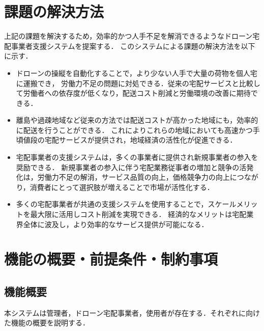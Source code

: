 \documentclass[a4paper, titlepage]{jsarticle}
\begin{document}
\section{課題の解決方法}
上記の課題を解決するため，効率的かつ人手不足を解消できるようなドローン宅配事業者支援システムを提案する．
このシステムによる課題の解決方法を以下に示す．
\begin{itemize}
    \item ドローンの操縦を自動化することで，より少ない人手で大量の荷物を個人宅に運搬でき，
    労働力不足の問題に対処できる．従来の宅配サービスと比較して労働者への依存度が低くなり，配送コスト削減と労働環境の改善に期待できる．

    \item 離島や過疎地域など従来の方法では配送コストが高かった地域にも，効率的に配送を行うことができる．
    これによりこれらの地域においても高速かつ手頃値段の宅配サービスが提供され，地域経済の活性化が促進できる．

    \item 宅配事業者の支援システムは，多くの事業者に提供され新規事業者の参入を奨励できる．
    新規事業者の参入に伴う宅配業務従事者の増加と競争の活発化は，労働力不足の解消，サービス品質の向上，価格競争力の向上につながり，消費者にとって選択肢が増えることで市場が活性化する．

    \item 多くの宅配事業者が共通の支援システムを使用することで，スケールメリットを最大限に活用しコスト削減を実現できる．
    経済的なメリットは宅配業界全体に波及し，より効率的なサービス提供が可能になる．


\end{itemize}

\section{機能の概要・前提条件・制約事項}
\subsection{機能概要}
本システムは管理者，ドローン宅配事業者，使用者が存在する．それぞれに向けた機能の概要を説明する．
\end{document}
